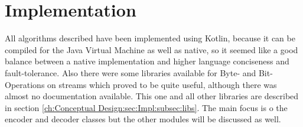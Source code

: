 \chapter{Implementation}
\label{ch:Implementation}
All algorithms described have been implemented using Kotlin, because it can be compiled for the Java Virtual Machine as well as native, so it seemed like a good balance between a native implementation and higher language conciseness and fault-tolerance. Also there were some libraries available for Byte- and Bit-Operations on streams which proved to be quite useful, although there was almost no documentation available. This one and all other libraries are described in section \ref{ch:Conceptual Design:sec:Impl:subsec:libs}. The main focus is o the encoder and decoder classes but the other modules will be discussed as well.

